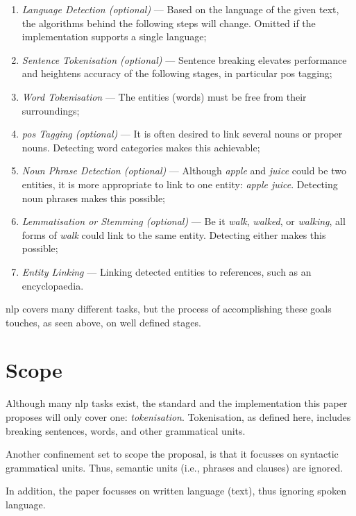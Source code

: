 \begin{enumerate}
\item\emph{Language Detection (optional)} --- Based on the language of the
    given text, the algorithms behind the following steps will change.
  Omitted if the implementation supports a single language;
\item\emph{Sentence Tokenisation (optional)} --- Sentence breaking elevates
    performance and heightens accuracy of the following stages, in
    particular \acrshort{pos} tagging;
\item\emph{Word Tokenisation} --- The entities (words) must be free from
  their surroundings;
\item\emph{\acrfull{pos} Tagging (optional)} --- It is often desired to link
    several nouns or proper nouns.
  Detecting word categories makes this achievable;
\item\emph{Noun Phrase Detection (optional)} --- Although \emph{apple} and
    \emph{juice} could be two entities, it is more appropriate to link to
    one entity: \emph{apple juice}.
  Detecting noun phrases makes this possible;
\item\emph{Lemmatisation or Stemming (optional)} --- Be it \emph{walk},
    \emph{walked}, or \emph{walking}, all forms of \emph{walk} could link
    to the same entity.
  Detecting either makes this possible;
\item\emph{Entity Linking} --- Linking detected entities to references, such
    as an encyclopaedia.
\end{enumerate}

\gls{nlp} covers many different tasks, but the process of accomplishing
  these goals touches, as seen above, on well defined stages.

\section{Scope}\label{scope}

Although many \gls{nlp} tasks exist, the standard and the implementation
  this paper proposes will only cover one: \emph{tokenisation}.
Tokenisation, as defined here, includes breaking sentences, words, and
other grammatical units.

Another confinement set to scope the proposal, is that it focusses on
  syntactic grammatical units. Thus, semantic units (i.e., phrases and
  clauses) are ignored.

In addition, the paper focusses on written language (text), thus ignoring
  spoken language.

